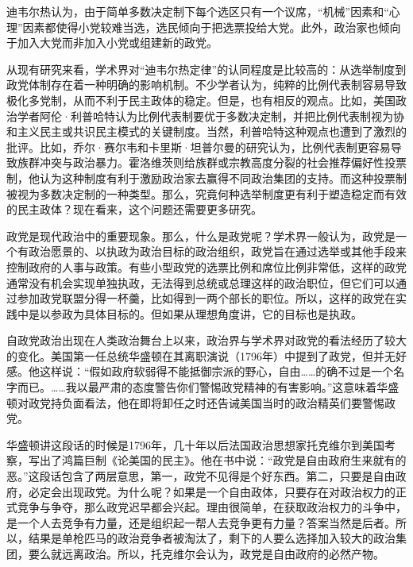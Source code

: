 迪韦尔热认为，由于简单多数决定制下每个选区只有一个议席，“机械”因素和“心理”因素都使得小党较难当选，选民倾向于把选票投给大党。此外，政治家也倾向于加入大党而非加入小党或组建新的政党。

从现有研究来看，学术界对“迪韦尔热定律”的认同程度是比较高的：从选举制度到政党体制存在着一种明确的影响机制。不少学者认为，纯粹的比例代表制容易导致极化多党制，从而不利于民主政体的稳定。但是，也有相反的观点。比如，美国政治学者阿伦·利普哈特认为比例代表制要优于多数决定制，并把比例代表制视为协和主义民主或共识民主模式的关键制度。当然，利普哈特这种观点也遭到了激烈的批评。比如，乔尔·赛尔韦和卡里斯·坦普尔曼的研究认为，比例代表制更容易导致族群冲突与政治暴力。霍洛维茨则给族群或宗教高度分裂的社会推荐偏好性投票制，他认为这种制度有利于激励政治家去赢得不同政治集团的支持。而这种投票制被视为多数决定制的一种类型。那么，究竟何种选举制度更有利于塑造稳定而有效的民主政体？现在看来，这个问题还需要更多研究。


政党是现代政治中的重要现象。那么，什么是政党呢？学术界一般认为，政党是一个有政治愿景的、以执政为政治目标的政治组织，政党旨在通过选举或其他手段来控制政府的人事与政策。有些小型政党的选票比例和席位比例非常低，这样的政党通常没有机会实现单独执政，无法得到总统或总理这样的政治职位，但它们可以通过参加政党联盟分得一杯羹，比如得到一两个部长的职位。所以，这样的政党在实践中是以参政为具体目标的。但如果从理想角度讲，它的目标也是执政。

自政党政治出现在人类政治舞台上以来，政治界与学术界对政党的看法经历了较大的变化。美国第一任总统华盛顿在其离职演说（1796年）中提到了政党，但并无好感。他这样说：“假如政府软弱得不能抵御宗派的野心，自由……的确不过是一个名字而已。……我以最严肃的态度警告你们警惕政党精神的有害影响。”这意味着华盛顿对政党持负面看法，他在即将卸任之时还告诫美国当时的政治精英们要警惕政党。

华盛顿讲这段话的时候是1796年，几十年以后法国政治思想家托克维尔到美国考察，写出了鸿篇巨制《论美国的民主》。他在书中说：“政党是自由政府生来就有的恶。”这段话包含了两层意思，第一，政党不见得是个好东西。第二，只要是自由政府，必定会出现政党。为什么呢？如果是一个自由政体，只要存在对政治权力的正式竞争与争夺，那么政党迟早都会兴起。理由很简单，在获取政治权力的斗争中，是一个人去竞争有力量，还是组织起一帮人去竞争更有力量？答案当然是后者。所以，结果是单枪匹马的政治竞争者被淘汰了，剩下的人要么选择加入较大的政治集团，要么就远离政治。所以，托克维尔会认为，政党是自由政府的必然产物。

